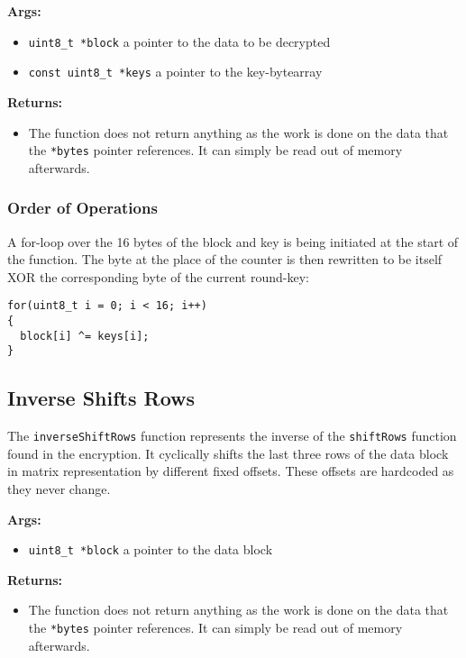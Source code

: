\textbf{Args:}
\begin{itemize}
  \item \lstinline{uint8_t *block} a pointer to the data to be decrypted
  \item \lstinline{const uint8_t *keys} a pointer to the key-bytearray
\end{itemize}

\textbf{Returns:}
\begin{itemize}
  \item The function does not return anything as the work is done on the data that the \lstinline{*bytes} pointer references. It can simply be read out of memory afterwards.
\end{itemize}

\subsubsection{Order of Operations}
A for-loop over the 16 bytes of the block and key is being initiated at the start of the function. The byte at the place of the counter is then rewritten to be itself XOR the corresponding byte of the current round-key:

\begin{lstlisting}
for(uint8_t i = 0; i < 16; i++)
{
  block[i] ^= keys[i];
}
\end{lstlisting}


\subsection{Inverse Shifts Rows}
\label{ch:dec_inverseshiftrows}

The \lstinline{inverseShiftRows} function represents the inverse of the \lstinline{shiftRows} function found in the encryption. It cyclically shifts the last three rows of the data block in matrix representation by different fixed offsets. These offsets are hardcoded as they never change.

\textbf{Args:}
\begin{itemize}
  \item \lstinline{uint8_t *block} a pointer to the data block
\end{itemize}

\textbf{Returns:}
\begin{itemize}
  \item The function does not return anything as the work is done on the data that the \lstinline{*bytes} pointer references. It can simply be read out of memory afterwards.
\end{itemize}

